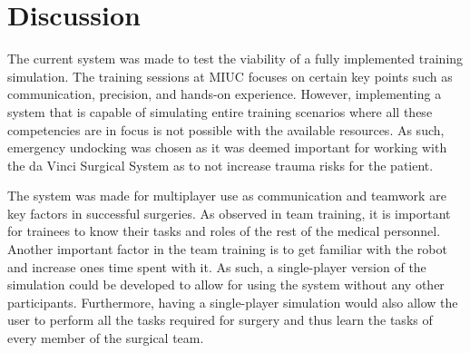 \section{Discussion}
The current system was made to test the viability of a fully implemented training simulation. The training sessions at MIUC focuses on certain key points such as communication, precision, and hands-on experience. However, implementing a system that is capable of simulating entire training scenarios where all these competencies are in focus is not possible with the available resources. As such, emergency undocking was chosen as it was deemed important for working with the da Vinci Surgical System as to not increase trauma risks for the patient.

The system was made for multiplayer use as communication and teamwork are key factors in successful surgeries. As observed in team training, it is important for trainees to know their tasks and roles of the rest of the medical personnel. Another important factor in the team training is to get familiar with the robot and increase ones time spent with it. As such, a single-player version of the simulation could be developed to allow for using the system without any other participants. Furthermore, having a single-player simulation would also allow the user to perform all the tasks required for surgery and thus learn the tasks of every member of the surgical team.

